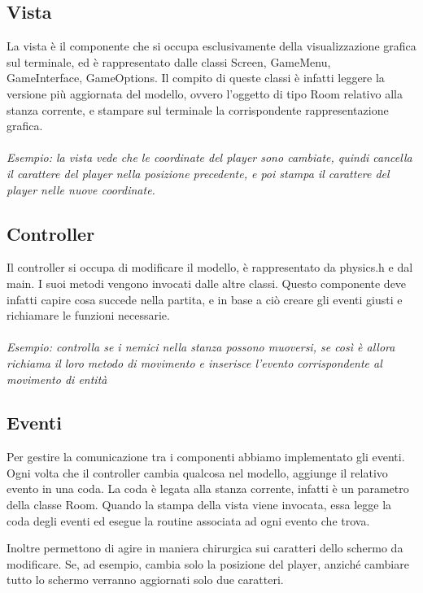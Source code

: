 \documentclass{article}
\begin{document}
\subsection{Vista}
La vista è il componente che si occupa esclusivamente della visualizzazione grafica sul terminale, ed è rappresentato dalle classi Screen, GameMenu,\\ GameInterface, GameOptions. 
Il compito di queste classi è infatti leggere la versione più aggiornata del modello, ovvero l'oggetto di tipo Room relativo alla stanza corrente, e stampare sul terminale la corrispondente rappresentazione grafica.
\\\\
\textit{Esempio: la vista vede che le coordinate del player sono cambiate, quindi cancella il carattere del player nella posizione precedente, e poi stampa il carattere del player nelle nuove coordinate.}

\subsection{Controller}
Il controller si occupa di modificare il modello, è rappresentato da physics.h e dal main. I suoi metodi vengono invocati dalle altre classi. Questo componente deve infatti capire cosa succede nella partita, e in base a ciò creare gli eventi giusti e richiamare le funzioni necessarie.
\\\\
\textit{Esempio: controlla se i nemici nella stanza possono muoversi, se così è allora richiama il loro metodo di movimento e inserisce l'evento corrispondente al movimento di entità}

\subsection{Eventi}
Per gestire la comunicazione tra i componenti abbiamo implementato gli eventi. Ogni volta che il controller cambia qualcosa nel modello, aggiunge il relativo evento in una coda. La coda è legata alla stanza corrente, infatti è un parametro della classe Room. Quando la stampa della vista viene invocata, essa legge la coda degli eventi ed esegue la routine associata ad ogni evento che trova. 

Inoltre permettono di agire in maniera chirurgica sui caratteri dello schermo da modificare. Se, ad esempio, cambia solo la posizione del player, anziché cambiare tutto lo schermo verranno aggiornati solo due caratteri.
\end{document}
